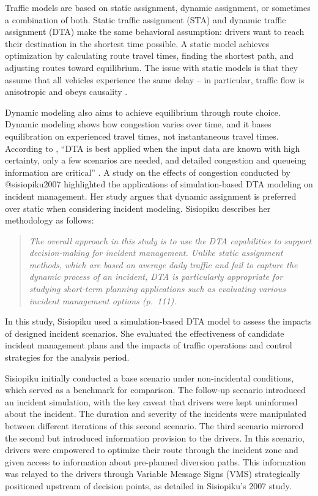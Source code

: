\documentclass[
  letterpaper,
  authoryear]{elsarticle}
\begin{document}
Traffic models are based on static assignment, dynamic assignment, or
sometimes a combination of both. Static traffic assignment (STA) and
dynamic traffic assignment (DTA) make the same behavioral assumption:
drivers want to reach their destination in the shortest time possible. A
static model achieves optimization by calculating route travel times,
finding the shortest path, and adjusting routes toward equilibrium. The
issue with static models is that they assume that all vehicles
experience the same delay -- in particular, traffic flow is anisotropic
and obeys causality \citep{boyles2018}.

Dynamic modeling also aims to achieve equilibrium through route choice.
Dynamic modeling shows how congestion varies over time, and it bases
equilibration on experienced travel times, not instantaneous travel
times. According to \citet{boyles2018}, ``DTA is best applied when the
input data are known with high certainty, only a few scenarios are
needed, and detailed congestion and queueing information are critical''
\citep[ p.~28]{boyles2018}. A study on the effects of congestion
conducted by @sisiopiku2007 highlighted the applications of
simulation-based DTA modeling on incident management. Her study argues
that dynamic assignment is preferred over static when considering
incident modeling. Sisiopiku describes her methodology as follows:

\begin{quote}
\emph{The overall approach in this study is to use the DTA capabilities
to support decision-making for incident management. Unlike static
assignment methods, which are based on average daily traffic and fail to
capture the dynamic process of an incident, DTA is particularly
appropriate for studying short-term planning applications such as
evaluating various incident management options (p.~111).}
\end{quote}

In this study, Sisiopiku used a simulation-based DTA model to assess the
impacts of designed incident scenarios. She evaluated the effectiveness
of candidate incident management plans and the impacts of traffic
operations and control strategies for the analysis period.

Sisiopiku initially conducted a base scenario under non-incidental
conditions, which served as a benchmark for comparison. The follow-up
scenario introduced an incident simulation, with the key caveat that
drivers were kept uninformed about the incident. The duration and
severity of the incidents were manipulated between different iterations
of this second scenario. The third scenario mirrored the second but
introduced information provision to the drivers. In this scenario,
drivers were empowered to optimize their route through the incident zone
and given access to information about pre-planned diversion paths. This
information was relayed to the drivers through Variable Message Signs
(VMS) strategically positioned upstream of decision points, as detailed
in Sisiopiku's 2007 study.
\end{document}
